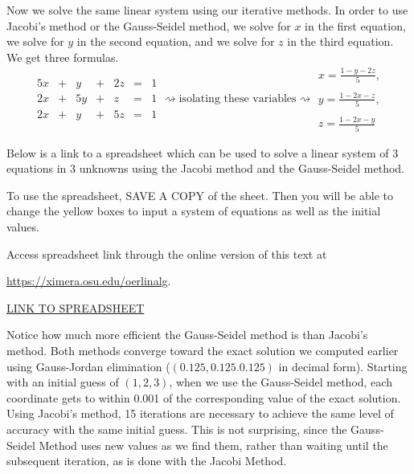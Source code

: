 \documentclass{ximera}
\begin{document}
\begin{example}
\begin{explanation}
Now we solve the same linear system using our iterative methods.  In order to use Jacobi's method or the Gauss-Seidel method, we solve for $x$ in the first equation, we solve for $y$ in the second equation, and we solve for $z$ in the third equation.  We get three formulas.
\begin{equation*}\begin{array}{ccccccc}
      5x & +&y&+&2z&= &1 \\ 
	 2x& +&5y&+&z&=&1\\ 
     2x& +&y&+&5z&=&1
    \end{array}
\rightsquigarrow\text{isolating these variables}\rightsquigarrow
\begin{array}{c}
      x=\frac{1-y-2z}{5},\\ \\
      y=\frac{1-2x-z}{5},\\ \\
      z=\frac{1-2x-y}{5}  
    \end{array}
\end{equation*}

Below is a link to a spreadsheet which can be used to solve a linear system of 3 equations in 3 unknowns using the Jacobi method and the Gauss-Seidel method.

To use the spreadsheet, SAVE A COPY of the sheet.  Then you will be able to change the yellow boxes to input a system of equations as well as the initial values. 

\begin{pdfOnly}
Access spreadsheet link through the online version of this text at 

\href{https://ximera.osu.edu/oerlinalg}{https://ximera.osu.edu/oerlinalg}.
\end{pdfOnly}

\begin{onlineOnly}
\href{https://docs.google.com/spreadsheets/d/1cjRChe6nwq1S-f-bGsnMFI632cuALhfUHnSvD_lC7oQ/edit?usp=sharing}{LINK TO SPREADSHEET}
\end{onlineOnly}



Notice how much more efficient the Gauss-Seidel method is than Jacobi's method.  Both methods converge toward the exact solution we computed earlier using Gauss-Jordan elimination ($(0.125,0.125.0.125)$ in decimal form).  Starting with an initial guess of $(1,2,3)$, when we use the Gauss-Seidel method, each coordinate gets to within 0.001 of the corresponding value of the exact solution.  Using Jacobi's method, 15 iterations are necessary to achieve the same level of accuracy with the same initial guess. This is not surprising, since the Gauss-Seidel Method uses new values as we find them, rather than waiting until the subsequent iteration, as is done with the Jacobi Method.
\end{explanation}
\end{example}
\end{document}
